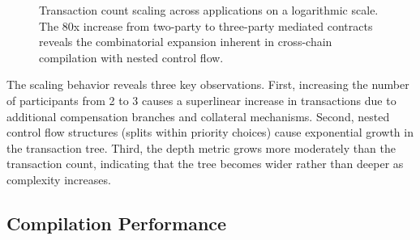 \documentclass[journal]{IEEEtran}
\begin{document}
\begin{figure}[t]
\centering
{}
\caption{Transaction count scaling across applications on a logarithmic scale. The 80x increase from two-party to three-party mediated contracts reveals the combinatorial expansion inherent in cross-chain compilation with nested control flow.}
\label{fig:scaling}
\end{figure}

The scaling behavior reveals three key observations. First, increasing the number of participants from 2 to 3 causes a superlinear increase in transactions due to additional compensation branches and collateral mechanisms. Second, nested control flow structures (splits within priority choices) cause exponential growth in the transaction tree. Third, the depth metric grows more moderately than the transaction count, indicating that the tree becomes wider rather than deeper as complexity increases.

\subsection{Compilation Performance}
\label{sec:compile-perf}
\end{document}
